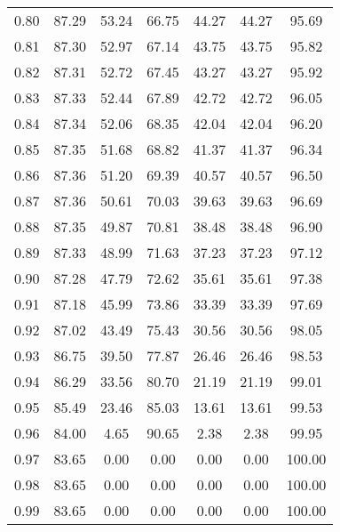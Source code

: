 \begin{tabular}{|c|c|c|c|c|c|c|}
      0.80 &     87.29 &     53.24 &      66.75 &   44.27 &      44.27 &         95.69 \\
      0.81 &     87.30 &     52.97 &      67.14 &   43.75 &      43.75 &         95.82 \\
      0.82 &     87.31 &     52.72 &      67.45 &   43.27 &      43.27 &         95.92 \\
      0.83 &     87.33 &     52.44 &      67.89 &   42.72 &      42.72 &         96.05 \\
      0.84 &     87.34 &     52.06 &      68.35 &   42.04 &      42.04 &         96.20 \\
      0.85 &     87.35 &     51.68 &      68.82 &   41.37 &      41.37 &         96.34 \\
      0.86 &     87.36 &     51.20 &      69.39 &   40.57 &      40.57 &         96.50 \\
      0.87 &     87.36 &     50.61 &      70.03 &   39.63 &      39.63 &         96.69 \\
      0.88 &     87.35 &     49.87 &      70.81 &   38.48 &      38.48 &         96.90 \\
      0.89 &     87.33 &     48.99 &      71.63 &   37.23 &      37.23 &         97.12 \\
      0.90 &     87.28 &     47.79 &      72.62 &   35.61 &      35.61 &         97.38 \\
      0.91 &     87.18 &     45.99 &      73.86 &   33.39 &      33.39 &         97.69 \\
      0.92 &     87.02 &     43.49 &      75.43 &   30.56 &      30.56 &         98.05 \\
      0.93 &     86.75 &     39.50 &      77.87 &   26.46 &      26.46 &         98.53 \\
      0.94 &     86.29 &     33.56 &      80.70 &   21.19 &      21.19 &         99.01 \\
      0.95 &     85.49 &     23.46 &      85.03 &   13.61 &      13.61 &         99.53 \\
      0.96 &     84.00 &      4.65 &      90.65 &    2.38 &       2.38 &         99.95 \\
      0.97 &     83.65 &      0.00 &       0.00 &    0.00 &       0.00 &        100.00 \\
      0.98 &     83.65 &      0.00 &       0.00 &    0.00 &       0.00 &        100.00 \\
      0.99 &     83.65 &      0.00 &       0.00 &    0.00 &       0.00 &        100.00 \\
\bottomrule
\end{tabular}

